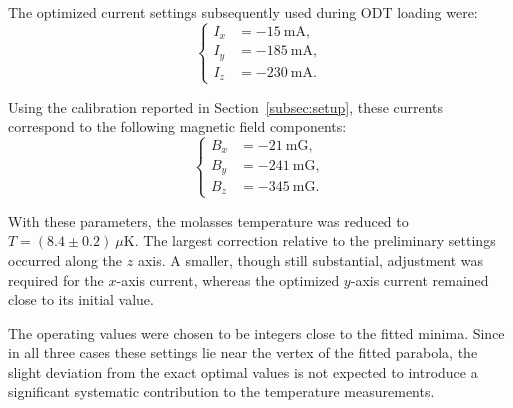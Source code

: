 The optimized current settings subsequently used during ODT loading were:
\begin{equation}
    \begin{cases}
        I_{x} &= -15~\mathrm{mA}, \\
        I_{y} &= -185~\mathrm{mA}, \\
        I_{z} &= -230~\mathrm{mA}.
    \end{cases}
    \label{eq:mol_shim_optimal_values}
\end{equation}

Using the calibration reported in Section~\ref{subsec:setup}, these currents correspond to the following magnetic field components:
\begin{equation}
    \begin{cases}
        B_{x} &= -21~\mathrm{mG}, \\
        B_{y} &= -241~\mathrm{mG}, \\
        B_{z} &= -345~\mathrm{mG}.
    \end{cases}
\end{equation}

With these parameters, the molasses temperature was reduced to $T=(8.4\pm0.2)~\mu\mathrm{K}$. The largest correction relative to the preliminary settings occurred along the $z$ axis. A smaller, though still substantial, adjustment was required for the $x$-axis current, whereas the optimized $y$-axis current remained close to its initial value.

The operating values were chosen to be integers close to the fitted minima. Since in all three cases these settings lie near the vertex of the fitted parabola, the slight deviation from the exact optimal values is not expected to introduce a significant systematic contribution to the temperature measurements.

